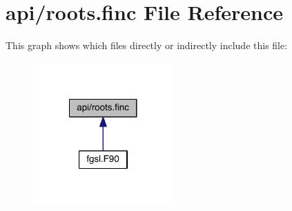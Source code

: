 \hypertarget{roots_8finc}{\section{api/roots.finc File Reference}
\label{roots_8finc}
}
This graph shows which files directly or indirectly include this file\-:
\nopagebreak
\begin{figure}[H]
\begin{center}
\leavevmode
\includegraphics[width=152pt]{roots_8finc__dep__incl}
\end{center}
\end{figure}
